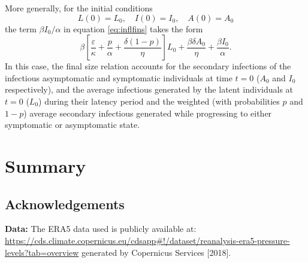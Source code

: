 \documentclass{book}
\begin{document}
More generally, for the initial conditions
$$
L(0)=L_{0}, \quad I(0)=I_{0}, \quad A(0)=A_{0}
$$
the term $\beta I_{0} / \alpha$ in equation \eqref{eq:inflfins} takes the form
$$
\beta\left[\frac{\varepsilon}{\kappa}+\frac{p}{\alpha}+\frac{\delta(1-p)}{\eta}\right] L_{0}+\frac{\beta \delta A_{0}}{\eta}+\frac{\beta I_{0}}{\alpha}.
$$
In this case, the final size relation accounts for the secondary infections of the infectious asymptomatic and symptomatic individuals at time $t=0$ ($A_0$ and $I_0$ respectively), and the average infectious generated by the latent individuals at $t=0$ ($L_0$) during their latency period and the weighted (with probabilities $p$ and $1-p$) average secondary infectious generated while progressing to either symptomatic or asymptomatic state.

\chapter*{Summary}
\label{chapt:summary}





\section{Acknowledgements}
\textbf{Data:} The ERA5 data used is publicly available at: \url{https://cds.climate.copernicus.eu/cdsapp#!/dataset/reanalysis-era5-pressure-levels?tab=overview} generated by Copernicus Services [2018].
\end{document}
